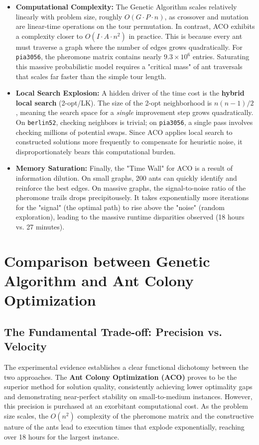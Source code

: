 \documentclass[11pt,a4paper]{article}
\begin{document}
\begin{itemize}[nosep]
  \item \textbf{Computational Complexity:} The Genetic Algorithm scales relatively linearly with problem size, roughly $O(G \cdot P \cdot n)$, as crossover and mutation are linear-time operations on the tour permutation. In contrast, ACO exhibits a complexity closer to $O(I \cdot A \cdot n^2)$ in practice. This is because every ant must traverse a graph where the number of edges grows quadratically. For \texttt{pia3056}, the pheromone matrix contains nearly $9.3 \times 10^6$ entries. Saturating this massive probabilistic model requires a "critical mass" of ant traversals that scales far faster than the simple tour length.
  \item \textbf{Local Search Explosion:} A hidden driver of the time cost is the \textbf{hybrid local search} (2-opt/LK). The size of the 2-opt neighborhood is $n(n-1)/2$, meaning the search space for a \textit{single} improvement step grows quadratically. On \texttt{berlin52}, checking neighbors is trivial; on \texttt{pia3056}, a single pass involves checking millions of potential swaps. Since ACO applies local search to constructed solutions more frequently to compensate for heuristic noise, it disproportionately bears this computational burden.
  \item \textbf{Memory Saturation:} Finally, the "Time Wall" for ACO is a result of information dilution. On small graphs, 200 ants can quickly identify and reinforce the best edges. On massive graphs, the signal-to-noise ratio of the pheromone trails drops precipitousely. It takes exponentially more iterations for the "signal" (the optimal path) to rise above the "noise" (random exploration), leading to the massive runtime disparities observed (18 hours vs. 27 minutes).
\end{itemize}

\section{Comparison between Genetic Algorithm and Ant Colony Optimization}
\subsection{The Fundamental Trade-off: Precision vs. Velocity}
The experimental evidence establishes a clear functional dichotomy between the two approaches. The \textbf{Ant Colony Optimization (ACO)} proves to be the superior method for solution quality, consistently achieving lower optimality gaps and demonstrating near-perfect stability on small-to-medium instances. However, this precision is purchased at an exorbitant computational cost. As the problem size scales, the $O(n^2)$ complexity of the pheromone matrix and the constructive nature of the ants lead to execution times that explode exponentially, reaching over 18 hours for the largest instance.
\end{document}
